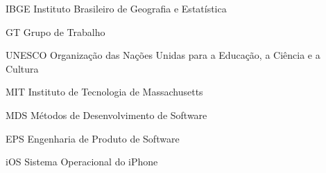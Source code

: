 \begin{siglas}
  \item[IBGE] Instituto Brasileiro de Geografia e Estatística
  \item[GT] Grupo de Trabalho
  \item[UNESCO] Organização das Nações Unidas para a Educação, a Ciência e a Cultura
  \item[MIT] Instituto de Tecnologia de Massachusetts
  \item[MDS] Métodos de Desenvolvimento de Software
  \item[EPS] Engenharia de Produto de Software
  \item[iOS] Sistema Operacional do iPhone 
\end{siglas}
